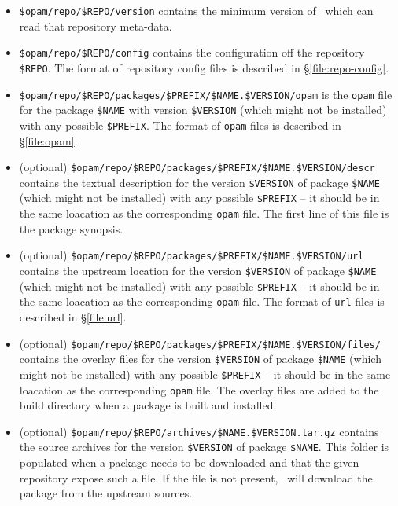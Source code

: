 \documentclass[a4paper,10pt]{article}
\begin{document}
\begin{itemize}

\item \verb+$opam/repo/$REPO/version+ contains the minimum version of
  \OPAM\ which can read that repository meta-data.

\item \verb+$opam/repo/$REPO/config+ contains the configuration
  off the repository \verb+$REPO+. The format of repository config
  files is described in \S\ref{file:repo-config}.

\item \verb+$opam/repo/$REPO/packages/$PREFIX/$NAME.$VERSION/opam+ is
  the {\tt opam} file for the package \verb+$NAME+ with version
  \verb+$VERSION+ (which might not be installed) with any possible
  \verb+$PREFIX+. The format of {\tt opam} files is described in
  \S\ref{file:opam}.

\item (optional) \verb+$opam/repo/$REPO/packages/$PREFIX/$NAME.$VERSION/descr+
  contains the textual description for the version \verb+$VERSION+ of
  package \verb+$NAME+ (which might not be installed) with any
  possible \verb+$PREFIX+ -- it should be in the same loacation as the
  corresponding {\tt opam} file. The first line of this file is the
  package synopsis.

\item (optional) \verb+$opam/repo/$REPO/packages/$PREFIX/$NAME.$VERSION/url+
  contains the upstream location for the version \verb+$VERSION+ of
  package \verb+$NAME+ (which might not be installed) with any
  possible \verb+$PREFIX+ -- it should be in the same loacation as the
  corresponding {\tt opam} file. The format of {\tt url} files is
  described in \S\ref{file:url}.

\item (optional) \verb+$opam/repo/$REPO/packages/$PREFIX/$NAME.$VERSION/files/+
  contains the overlay files for the version \verb+$VERSION+ of
  package \verb+$NAME+ (which might not be installed) with any
  possible \verb+$PREFIX+ -- it should be in the same loacation as the
  corresponding {\tt opam} file. The overlay files are added to the
  build directory when a package is built and installed.

\item (optional)
  \verb+$opam/repo/$REPO/archives/$NAME.$VERSION.tar.gz+ contains the
  source archives for the version \verb+$VERSION+ of package
  \verb+$NAME+. This folder is populated when a package needs to be
  downloaded and that the given repository expose such a file. If the
  file is not present, \OPAM\ will download the package from the
  upstream sources.

\end{itemize}
\end{document}
